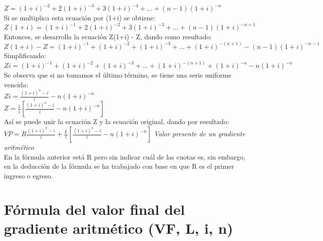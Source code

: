$Z = (1+i)^{-2} + 2(1+i)^{-3} + 3(1+i)^{-4} + ... + (n-1)(1+i)^{-n}$ \\
	
	Si se multiplica esta ecuación por (1+i) se obtiene: \\
	
$Z(1+i) = (1+i)^{-1} + 2(1+i)^{-2} + 3(1+i)^{-3} + ... + (n-1)(1+i)^{-n+1}$ \\
	
	Entonces, se desarrolla la ecuación Z(1+i) - Z, dando como resultado: \\
	
$Z(1+i) - Z = (1+i)^{-1} + (1+i)^{-2} + (1+i)^{-3} + ... + (1+i)^{-(n+1)} - (n-1)(1+i)^{-n-1}$ \\
	
	Simplificando: \\
	
$Zi = (1+i)^{-1} + (1+i)^{-2} + (1+i)^{-3} + ... + (1+i)^{-(n+1)} +  (1+i)^{-n} - n(1+i)^{-n}$ \\
	
	Se observa que si no tomamos el último término, se tiene una serie uniforme vencida:\\
	
$Zi = \frac{(1+i)^n-i}{i} - n(1+i)^{-n} $\\
	
$Z = \frac{1}{i}[\frac{(1+i)^n-i}{i} - n(1+i)^{-n}]$\\
	
	Así se puede unir la ecuación Z y la ecuación original, dando por resultado:\\
	
	
$VP=R\frac{(1+i)^n-i}{i}+\frac{L}{i}[\frac{(1+i)^n-i}{i}-n(1+i)^{-n}]$\hspace{35 pt} \textit{Valor presente de un gradiente aritmético}\\
	
	En la fórmula anterior está R pero sin indicar cuál de las cuotas es, sin embargo, en la deducción de la fórmula se ha trabajado con base en que R es el primer ingreso o egreso. \\




	
	\section{Fórmula del valor final del gradiente aritmético (VF, L, i, n)}
	
